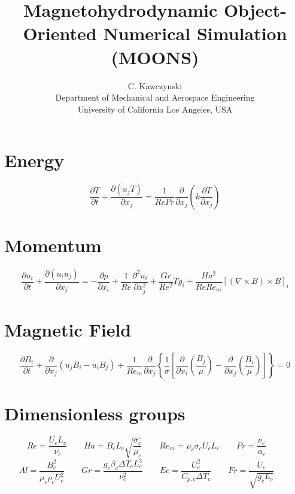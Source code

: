 \documentclass[11pt]{article}
\begin{document}
\doublespacing
\title{Magnetohydrodynamic Object-Oriented Numerical Simulation (MOONS)}
\author{C. Kawczynski \\
Department of Mechanical and Aerospace Engineering \\
University of California Los Angeles, USA\\}

\section{Energy}
\Large
\begin{equation}
	\frac{\partial T}{\partial t} +
	\frac{\partial (u_j T)}{\partial x_j}
	= 
	\frac{1}{Re Pr}
	\frac{\partial}{\partial x_j}
	\left( 
	k \frac{\partial T}{\partial x_j}
	\right)
\end{equation}
\section{Momentum}
\begin{equation}
	\frac{\partial u_i}{\partial t} + 
	\frac{\partial (u_i u_j)}{\partial x_j}
	= 
	- \frac{\partial p}{\partial x_i}
	+ \frac{1}{Re}
	\frac{\partial^2 u_i}{\partial x_j^2}
	+ \frac{Gr}{Re^2}
	T g_i
	+ \frac{Ha^2}{Re Re_m}
	[(\nabla \times B) \times B]_i
\end{equation}
\section{Magnetic Field}
\begin{equation}
	\frac{\partial B_i}{\partial t} 
	+ \frac{\partial}{\partial x_j} (u_j B_i - u_i B_j) 
	+ \frac{1}{Re_m}
	\frac{\partial}{\partial x_j} 
	\left\{ \frac{1}{\sigma} 
	\left[ 
	\frac{\partial}{\partial x_i} 
	\left( \frac{B_j}{\mu} \right) - 
	\frac{\partial}{\partial x_j} 
	\left( \frac{B_i}{\mu} \right)
	\right]
	\right\} = 0
\end{equation}

\section{Dimensionless groups}
\begin{equation}
	Re = \frac{U_c L_c}{\nu_c} \qquad
	Ha = B_c L_c \sqrt{\frac{\sigma_c}{\mu_c}} \qquad
	Re_m = \mu_c \sigma_c U_c L_c \qquad
	Pr = \frac{\nu_c}{\alpha_c} \qquad
\end{equation}
\begin{equation}
	Al = \frac{B_c^2}{\mu_c \rho_c U_c^2} \qquad
	Gr = \frac{g_c \beta_c \Delta T_c L_c^3}{\nu_c^2} \qquad
	Ec = \frac{U_c^2}{C_{p,c} \Delta T_c} \qquad
	Fr = \frac{U_c}{\sqrt{g_c L_c}} \qquad
\end{equation}
\end{document}
